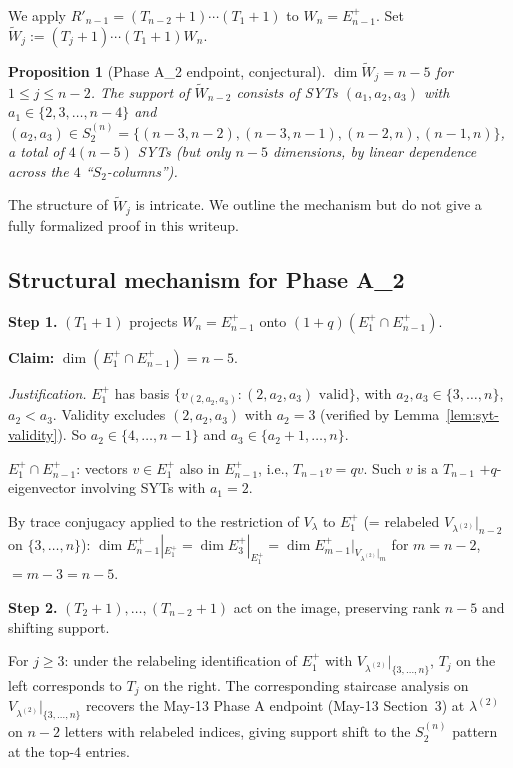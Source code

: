 \documentclass[11pt]{article}
\newtheorem{proposition}[theorem]{Proposition}
\theoremstyle{definition}
\begin{document}
We apply $R'_{n-1}=(T_{n-2}{+}1)\cdots(T_1{+}1)$ to $W_n=E_{n-1}^+$.
Set $\widetilde{W}_j:=(T_j{+}1)\cdots(T_1{+}1)W_n$.

\begin{proposition}[Phase A_2 endpoint, conjectural]
\label{prop:phaseA2}
$\dim\widetilde{W}_j=n-5$ for $1\le j\le n-2$.  The support of
$\widetilde{W}_{n-2}$ consists of SYTs $(a_1,a_2,a_3)$ with
$a_1\in\{2,3,\ldots,n-4\}$ and $(a_2,a_3)\in S_2^{(n)}=
\{(n{-}3,n{-}2),(n{-}3,n{-}1),(n{-}2,n),(n{-}1,n)\}$, a total
of $4(n-5)$ SYTs (but only $n-5$ dimensions, by linear dependence
across the $4$ ``$S_2$-columns'').
\end{proposition}

The structure of $\widetilde{W}_j$ is intricate.  We outline the
mechanism but do not give a fully formalized proof in this
writeup.

\subsection{Structural mechanism for Phase A_2}

\textbf{Step 1.}  $(T_1{+}1)$ projects $W_n=E_{n-1}^+$ onto
$(1{+}q)(E_1^+\cap E_{n-1}^+)$.

\textbf{Claim:} $\dim(E_1^+\cap E_{n-1}^+)=n-5$.

\emph{Justification.}  $E_1^+$ has basis $\{v_{(2,a_2,a_3)}:
(2,a_2,a_3)\text{ valid}\}$, with $a_2,a_3\in\{3,\ldots,n\}$,
$a_2<a_3$.  Validity excludes $(2,a_2,a_3)$ with $a_2=3$
(verified by Lemma~\ref{lem:syt-validity}).  So $a_2\in\{4,
\ldots,n-1\}$ and $a_3\in\{a_2+1,\ldots,n\}$.

$E_1^+\cap E_{n-1}^+$: vectors $v\in E_1^+$ also in $E_{n-1}^+$,
i.e., $T_{n-1}v=qv$.  Such $v$ is a $T_{n-1}$ $+q$-eigenvector
involving SYTs with $a_1=2$.

By trace conjugacy applied to the restriction of $V_\lambda$ to
$E_1^+$ (= relabeled $V_{\lambda^{(2)}}|_{n-2}$ on
$\{3,\ldots,n\}$): $\dim E_{n-1}^+|_{E_1^+}=\dim E_3^+|_{E_1^+}=
\dim E_{m-1}^+|_{V_{\lambda^{(2)}}|_m}$ for $m=n-2$,
$=m-3=n-5$.

\textbf{Step 2.}  $(T_2{+}1),\ldots,(T_{n-2}{+}1)$ act on the
image, preserving rank $n-5$ and shifting support.

For $j\ge 3$: under the relabeling identification of $E_1^+$
with $V_{\lambda^{(2)}}|_{\{3,\ldots,n\}}$, $T_j$ on the left
corresponds to $T_j$ on the right.  The corresponding staircase
analysis on $V_{\lambda^{(2)}}|_{\{3,\ldots,n\}}$ recovers the
May-13 Phase A endpoint (May-13 Section~3) at $\lambda^{(2)}$ on
$n-2$ letters with relabeled indices, giving support shift to
the $S_2^{(n)}$ pattern at the top-$4$ entries.
\end{document}
